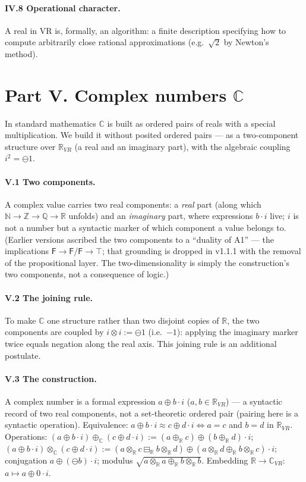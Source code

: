 \documentclass[11pt]{article}
\theoremstyle{definition}
\newcommand{\F}{\mathsf{F}}
\newcommand{\T}{\top}
\newcommand{\Z}{\mathbb{Z}}
\newcommand{\Q}{\mathbb{Q}}
\newcommand{\R}{\mathbb{R}}
\newcommand{\C}{\mathbb{C}}
\newcommand{\N}{\mathbb{N}}
\newcommand{\isub}{\ominus}              %
\begin{document}
\paragraph{IV.8 Operational character.} A real in VR is, formally, an algorithm: a finite description
specifying how to compute arbitrarily close rational approximations (e.g.\ $\sqrt 2$ by Newton's method).

\section*{Part V. Complex numbers $\C$}

In standard mathematics $\C$ is built as ordered pairs of reals with a special multiplication. We
build it without posited ordered pairs --- as a two-component structure over $\R_{VR}$ (a real and an
imaginary part), with the algebraic coupling $i^2=\isub 1$.

\paragraph{V.1 Two components.} A complex value carries two real components: a \emph{real} part
(along which $\N\to\Z\to\Q\to\R$ unfolds) and an \emph{imaginary} part, where expressions
$b\cdot i$ live; $i$ is not a number but a syntactic marker of which component a value belongs to.
(Earlier versions ascribed the two components to a ``duality of A1'' --- the implications
$\F\to\F$/$\F\to\T$; that grounding is dropped in v1.1.1 with the removal of the propositional
layer. The two-dimensionality is simply the construction's two components, not a consequence of logic.)

\paragraph{V.2 The joining rule.} To make $\C$ one structure rather than two disjoint copies of $\R$,
the two components are coupled by $i\otimes i := \isub 1$ (i.e.\ $-1$): applying the imaginary marker twice equals
negation along the real axis. This joining rule is an additional postulate.

\paragraph{V.3 The construction.} A complex number is a formal expression $a\oplus b\cdot i$ ($a,b\in\R_{VR}$) ---
a syntactic record of two real components, not a set-theoretic ordered pair (pairing here is a syntactic operation). Equivalence: $a\oplus b\cdot i
\approx c\oplus d\cdot i \Leftrightarrow a=c$ and $b=d$ in $\R_{VR}$. Operations:
$(a\oplus b\cdot i)\oplus_{\C}(c\oplus d\cdot i):=(a\oplus_{\R} c)\oplus(b\oplus_{\R} d)\cdot i$;\
$(a\oplus b\cdot i)\otimes_{\C}(c\oplus d\cdot i):=(a\otimes_{\R} c\boxminus_{\R} b\otimes_{\R} d)
\oplus(a\otimes_{\R} d\oplus_{\R} b\otimes_{\R} c)\cdot i$; conjugation $a\oplus(\ominus b)\cdot i$;
modulus $\sqrt{a\otimes_{\R} a\oplus_{\R} b\otimes_{\R} b}$. Embedding $\R\to\C_{VR}$:
$a\mapsto a\oplus 0\cdot i$.
\end{document}
